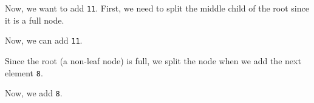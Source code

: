 \documentclass[a4paper, openany]{memoir}
\begin{document}
Now, we want to add \texttt{11}. First, we need to split the middle child of the root since it is a full node.
\begin{center}
\end{center}
Now, we can add \texttt{11}.
\begin{center}
\end{center}
Since the root (a non-leaf node) is full, we split the node when we add the next element \texttt{8}.
\begin{center}
\end{center}
Now, we add \texttt{8}.
\begin{center}
\end{center}
\end{document}
